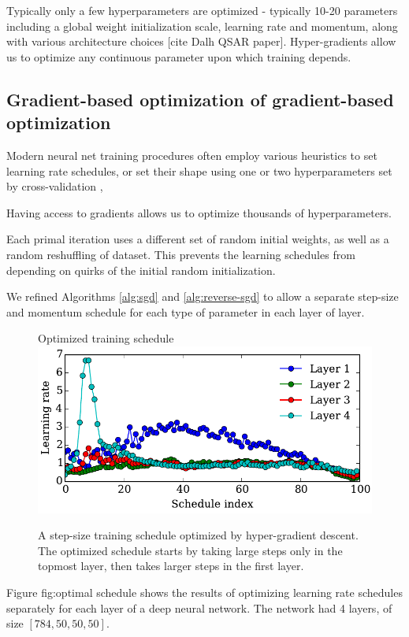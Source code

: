 \documentclass{article}
\begin{document}
Typically only a few hyperparameters are optimized - typically 10-20 parameters including a global weight initialization scale, learning rate and momentum, along with various architecture choices [cite Dalh QSAR paper].
Hyper-gradients allow us to optimize any continuous parameter upon which training depends.


\subsection{Gradient-based optimization of gradient-based optimization}

Modern neural net training procedures often employ various heuristics to set learning rate schedules, or set their shape using one or two hyperparameters set by cross-validation \citep{dahl2014multi}, \citep{sutskever2013importance}

Having access to gradients allows us to optimize thousands of hyperparameters.

Each primal iteration uses a different set of random initial weights, as well as a random reshuffling of dataset.
This prevents the learning schedules from depending on quirks of the initial random initialization.

We refined Algorithms \ref{alg:sgd} and \ref{alg:reverse-sgd} to allow a separate step-size and momentum schedule for each type of parameter in each layer of layer.
%
\begin{figure}[h!]
\vskip 0.2in
\begin{center}
Optimized training schedule \\
\includegraphics[width=\columnwidth]{../experiments/Feb_3_training_schedules/3_adam_50/schedules_small.pdf}
\caption{A step-size training schedule optimized by hyper-gradient descent.
The optimized schedule starts by taking large steps only in the topmost layer, then takes larger steps in the first layer.}
\label{fig:optimal schedule}
\end{center}
\vskip -0.2in
\end{figure} 
%
Figure {fig:optimal schedule} shows the results of optimizing learning rate schedules separately for each layer of a deep neural network.
The network had 4 layers, of size $[784, 50, 50, 50]$.
\end{document}
